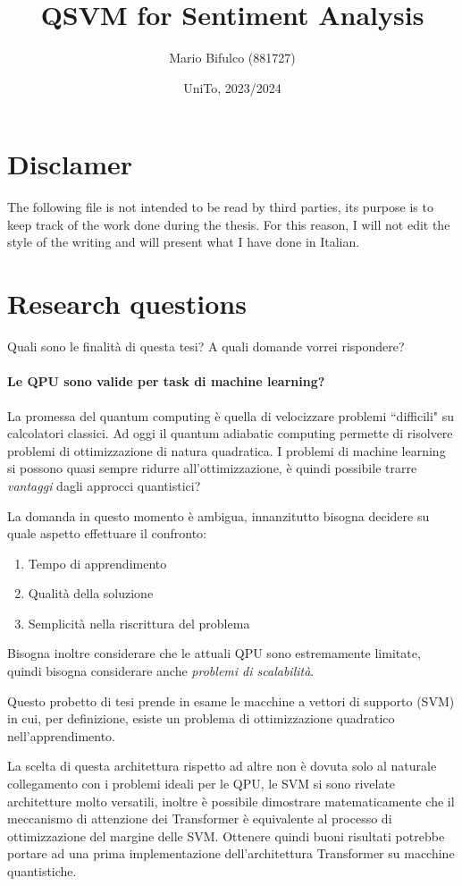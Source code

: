 \documentclass[12pt]{article}
\title{QSVM for Sentiment Analysis}
\author{Mario Bifulco (881727)}
\date{UniTo, 2023/2024}
\begin{document}
\maketitle

\section{Disclamer}

The following file is not intended to be read by third parties, 
its purpose is to keep track of the work done during the thesis. 
For this reason, I will not edit the style of the writing and will present what I have done in Italian.

\section{Research questions}

Quali sono le finalità di questa tesi? A quali domande vorrei rispondere?

\paragraph{Le QPU sono valide per task di machine learning?} 
La promessa del quantum computing è quella di velocizzare problemi “difficili" su calcolatori classici.
Ad oggi il quantum adiabatic computing permette di risolvere problemi di ottimizzazione di natura quadratica.
I problemi di machine learning si possono quasi sempre ridurre all'ottimizzazione, 
è quindi possibile trarre \emph{vantaggi} dagli approcci quantistici?

La domanda in questo momento è ambigua, innanzitutto bisogna decidere su quale aspetto effettuare il confronto:
\begin{enumerate}
    \item Tempo di apprendimento
    \item Qualità della soluzione
    \item Semplicità nella riscrittura del problema
\end{enumerate}
Bisogna inoltre considerare che le attuali QPU sono estremamente limitate, 
quindi bisogna considerare anche \emph{problemi di scalabilità}.

Questo probetto di tesi prende in esame le macchine a vettori di supporto (SVM) in cui, per definizione, 
esiste un problema di ottimizzazione quadratico nell'apprendimento.

La scelta di questa architettura rispetto ad altre non è dovuta solo al naturale collegamento con i problemi ideali per le QPU,
le SVM si sono rivelate architetture molto versatili, inoltre è possibile dimostrare matematicamente che il meccanismo di attenzione dei Transformer è equivalente al processo di ottimizzazione del margine delle SVM.
Ottenere quindi buoni risultati potrebbe portare ad una prima implementazione dell'architettura Transformer su macchine quantistiche.
\end{document}
